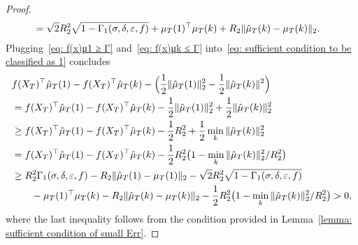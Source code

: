 \begin{proof}
\begin{align}
&= \sqrt{2}R_2^2\sqrt{1 - \Gamma_1(\sigma, \delta, \varepsilon, f)} + \mu_T(1)^\top\mu_T(k) + R_2\Vert{\hat{\mu}_T(k) - \mu_T(k)}\Vert_2.
\end{align}
Plugging~\eqref{eq: f(x)μ1 ≥ Γ} and~\eqref{eq: f(x)μk ≤ Γ} into~\eqref{eq: sufficient condition to be classified as 1} concludes
\begin{align*}
&f(X_T)^{\top}\hat{\mu}_T(1) - f(X_T)^{\top}\hat{\mu}_T(k) - \Big(\frac{1}{2}\Vert{\hat{\mu}_T(1)}\Vert_2^2 - \frac{1}{2}\Vert{\hat{\mu}_T(k)}\Vert^2\Big) \\
&= f(X_T)^{\top}\hat{\mu}_T(1) - f(X_T)^{\top}\hat{\mu}_T(k) - \frac{1}{2}\Vert{\hat{\mu}_T(1)}\Vert^2_2 + \frac{1}{2}\Vert{\hat{\mu}_T(k)}\Vert^2_2 \\
&\geq f(X_T)^{\top}\hat{\mu}_T(1) - f(X_T)^{\top}\hat{\mu}_T(k) - \frac{1}{2}R_2^2 + \frac{1}{2}\min_{k}\Vert{\hat{\mu}_T(k)}\Vert_2^2 \\
&= f(X_T)^{\top}\hat{\mu}_T(1) - f(X_T)^{\top}\hat{\mu}_T(k) - \frac{1}{2}R_2^2\big(1 - \min_{k}\Vert{\hat{\mu}_T(k)}\Vert_2^2 / R_2^2\big) \\
&\geq R_2^2\Gamma_1(\sigma, \delta, \varepsilon, f) - R_2\Vert{\hat{\mu}_T(1) - \mu_T(1)}\Vert_2 - \sqrt{2}R_2^2\sqrt{1 - \Gamma_1(\sigma, \delta, \varepsilon, f)} \\
&\qquad - \mu_T(1)^\top\mu_T(k) - R_2\Vert{\hat{\mu}_T(k) - \mu_T(k)}\Vert_2 - \frac{1}{2}R_2^2\big(1 - \min_{k}\Vert{\hat{\mu}_T(k)}\Vert_2^2 / R_2^2\big) > 0,
\end{align*}
where the last inequality follows from the condition provided in Lemma~\ref{lemma: sufficient condition of small Err}.
\end{proof}


